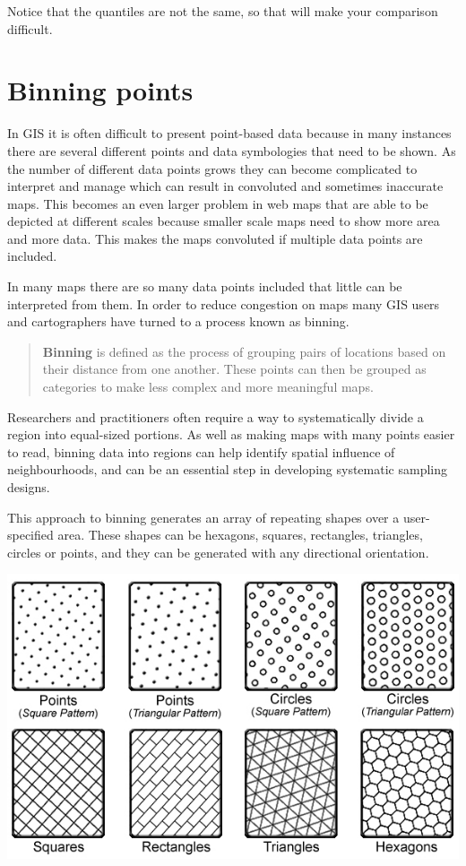 \documentclass[]{book}
\begin{document}
Notice that the quantiles are not the same, so that will make your comparison difficult.

\hypertarget{binning-points}{%
\section{Binning points}\label{binning-points}}

In GIS it is often difficult to present point-based data because in many instances there are several different points and data symbologies that need to be shown. As the number of different data points grows they can become complicated to interpret and manage which can result in convoluted and sometimes inaccurate maps. This becomes an even larger problem in web maps that are able to be depicted at different scales because smaller scale maps need to show more area and more data. This makes the maps convoluted if multiple data points are included.

In many maps there are so many data points included that little can be interpreted from them. In order to reduce congestion on maps many GIS users and cartographers have turned to a process known as binning.

\begin{quote}
\textbf{Binning} is defined as the process of grouping pairs of locations based on their distance from one another. These points can then be grouped as categories to make less complex and more meaningful maps.
\end{quote}

Researchers and practitioners often require a way to systematically divide a region into equal-sized portions. As well as making maps with many points easier to read, binning data into regions can help identify spatial influence of neighbourhoods, and can be an essential step in developing systematic sampling designs.

This approach to binning generates an array of repeating shapes over a user-specified area. These shapes can be hexagons, squares, rectangles, triangles, circles or points, and they can be generated with any directional orientation.

\includegraphics{img/shape_patterns_manual.jpg}
\end{document}

